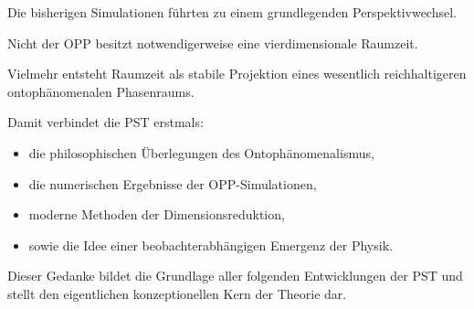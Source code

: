 Die bisherigen Simulationen führten zu einem grundlegenden Perspektivwechsel.

Nicht der OPP besitzt notwendigerweise eine vierdimensionale Raumzeit.

Vielmehr entsteht Raumzeit als stabile Projektion eines wesentlich reichhaltigeren ontophänomenalen Phasenraums.

Damit verbindet die PST erstmals:

\begin{itemize}

\item die philosophischen Überlegungen des Ontophänomenalismus,

\item die numerischen Ergebnisse der OPP-Simulationen,

\item moderne Methoden der Dimensionsreduktion,

\item sowie die Idee einer beobachterabhängigen Emergenz der Physik.

\end{itemize}

Dieser Gedanke bildet die Grundlage aller folgenden Entwicklungen der PST und stellt den eigentlichen konzeptionellen Kern der Theorie dar.

